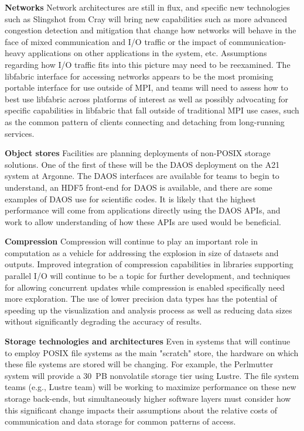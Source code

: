 \textbf{Networks} Network architectures are still in flux, and specific new technologies such as Slingshot from Cray will bring new capabilities such as more advanced congestion detection and mitigation that change how networks will behave in the face of mixed communication and I/O traffic or the impact of communication-heavy applications on other applications in the system, etc.  Assumptions regarding how I/O traffic fits into this picture may need to be reexamined. The libfabric interface for accessing networks appears to be the most promising portable interface for use outside of MPI, and teams will need to assess how to best use libfabric across platforms of interest as well as possibly advocating for specific capabilities in libfabric that fall outside of traditional MPI use cases, such as the common pattern of clients connecting and detaching from long-running services.

\textbf{Object stores} Facilities are planning deployments of non-POSIX storage solutions. One of the first of these will be the DAOS deployment on the A21 system at Argonne. The DAOS interfaces are available for teams to begin to understand, an HDF5 front-end for DAOS is available, and there are some examples of DAOS use for scientific codes. It is likely that the highest performance will come from applications directly using the DAOS APIs, and work to allow understanding of how these APIs are used would be beneficial.

\textbf{Compression} Compression will continue to play an important role in computation as a vehicle for addressing the explosion in size of datasets and outputs. Improved integration of compression capabilities in libraries supporting parallel I/O will continue to be a topic for further development, and techniques for allowing concurrent updates while compression is enabled specifically need more exploration.  The use of lower precision data types has the potential of speeding up the visualization and analysis process as well as reducing data sizes without significantly degrading the accuracy of results. 

\textbf{Storage technologies and architectures} Even in systems that will continue to employ POSIX file systems as the main "scratch" store, the hardware on which these file systems are stored will be changing. For example, the Perlmutter system will provide a 30~PB nonvolatile storage tier using Lustre. The file system teams (e.g., Lustre team) will be working to maximize performance on these new storage back-ends, but simultaneously higher software layers must consider how this significant change impacts their assumptions about the relative costs of communication and data storage for common patterns of access.


